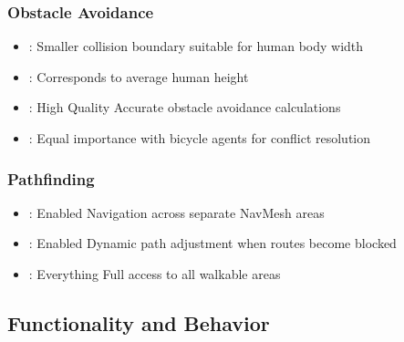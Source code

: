 \documentclass[letterpaper,10pt,english]{jupyterBook}
\begin{document}
\subsubsection{Obstacle Avoidance}
\label{\detokenize{Human Agent:obstacle-avoidance}}\begin{itemize}
\item {} 
\sphinxAtStartPar
{}:  \sphinxhyphen{} Smaller collision boundary suitable for human body width

\item {} 
\sphinxAtStartPar
{}:  \sphinxhyphen{} Corresponds to average human height

\item {} 
\sphinxAtStartPar
{}: High Quality \sphinxhyphen{} Accurate obstacle avoidance calculations

\item {} 
\sphinxAtStartPar
{}:  \sphinxhyphen{} Equal importance with bicycle agents for conflict resolution

\end{itemize}


\subsubsection{Pathfinding}
\label{\detokenize{Human Agent:pathfinding}}\begin{itemize}
\item {} 
\sphinxAtStartPar
{}: Enabled \sphinxhyphen{} Navigation across separate NavMesh areas

\item {} 
\sphinxAtStartPar
{}: Enabled \sphinxhyphen{} Dynamic path adjustment when routes become blocked

\item {} 
\sphinxAtStartPar
{}: Everything \sphinxhyphen{} Full access to all walkable areas

\end{itemize}


\subsection{Functionality and Behavior}
\label{\detokenize{Human Agent:functionality-and-behavior}}
\end{document}
